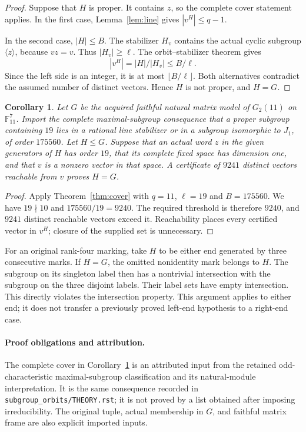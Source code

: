 \documentclass[11pt]{article}
\newtheorem{corollary}[lemma]{Corollary}
\begin{document}
\begin{proof}
Suppose that $H$ is proper. It contains $z$, so the complete cover
statement applies. In the first case, Lemma~\ref{lem:line} gives
$|v^H|\leq q-1$.

In the second case, $|H|\leq B$. The stabilizer $H_v$ contains the
actual cyclic subgroup $\langle z\rangle$, because $vz=v$. Thus
$|H_v|\geq\ell$. The orbit--stabilizer theorem gives
\[
 |v^H|=|H|/|H_v|\leq B/\ell.
\]
Since the left side is an integer, it is at most $\lfloor B/\ell\rfloor$.
Both alternatives contradict the assumed number of distinct vectors.
Hence $H$ is not proper, and $H=G$.
\end{proof}

\begin{corollary}\label{cor:g2}
Let $G$ be the acquired faithful natural matrix model of $G_2(11)$ on
$\mathbb F_{11}^{7}$. Import the complete maximal-subgroup consequence
that a proper subgroup containing $19$ lies in a rational line
stabilizer or in a subgroup isomorphic to $J_1$, of order $175560$.
Let $H\leq G$. Suppose that an actual word $z$ in the given generators
of $H$ has order $19$, that its complete fixed space has dimension one,
and that $v$ is a nonzero vector in that space. A certificate of $9241$
distinct vectors reachable from $v$ proves $H=G$.
\end{corollary}

\begin{proof}
Apply Theorem~\ref{thm:cover} with $q=11$, $\ell=19$ and $B=175560$.
We have $19\nmid10$ and $175560/19=9240$. The required threshold is
therefore $9240$, and $9241$ distinct reachable vectors exceed it.
Reachability places every certified vector in $v^H$; closure of the
supplied set is unnecessary.
\end{proof}

For an original rank-four marking, take $H$ to be either end generated
by three consecutive marks. If $H=G$, the omitted nonidentity mark belongs
to $H$. The subgroup on its singleton label then has a nontrivial
intersection with the subgroup on the three disjoint labels. Their label
sets have empty intersection. This directly violates the intersection
property. This argument applies to either end; it does not transfer a
previously proved left-end hypothesis to a right-end case.

\paragraph{Proof obligations and attribution.}
The complete cover in Corollary~\ref{cor:g2} is an attributed input from
the retained odd-characteristic maximal-subgroup classification and its
natural-module interpretation. It is the same consequence recorded in
\texttt{subgroup\_orbits/THEORY.rst}; it is not proved by a list obtained
after imposing irreducibility. The original tuple, actual membership in
$G$, and faithful matrix frame are also explicit imported inputs.
\end{document}
